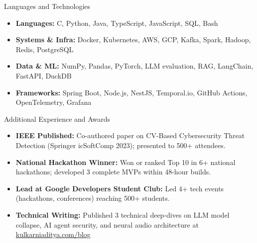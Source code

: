 \documentclass[]{mcdowellcv}
\begin{document}
\begin{cvsection}{Languages and Technologies}
  \begin{cvsubsection}{}{}{}
    \begin{itemize}
      \item \textbf{Languages:} C, Python, Java, TypeScript, JavaScript, SQL, Bash
      \item \textbf{Systems \& Infra:} Docker, Kubernetes, AWS, GCP, Kafka, Spark, Hadoop, Redis, PostgreSQL
      \item \textbf{Data \& ML:} NumPy, Pandas, PyTorch, LLM evaluation, RAG, LangChain, FastAPI, DuckDB
      \item \textbf{Frameworks:} Spring Boot, Node.js, NestJS, Temporal.io, GitHub Actions, OpenTelemetry, Grafana
    \end{itemize}
  \end{cvsubsection}
\end{cvsection}

\begin{cvsection}{Additional Experience and Awards}
  \begin{cvsubsection}{}{}{}
    \begin{itemize}
      \item \textbf{IEEE Published:} Co-authored paper on CV-Based Cybersecurity Threat Detection (Springer icSoftComp 2023); presented to 500+ attendees.
      \item \textbf{National Hackathon Winner:} Won or ranked Top 10 in 6+ national hackathons; developed 3 complete MVPs within 48-hour builds.
      \item \textbf{Lead at Google Developers Student Club:} Led 4+ tech events (hackathons, conferences) reaching 500+ students.
      \item \textbf{Technical Writing:} Published 3 technical deep-dives on LLM model collapse, AI agent security, and neural audio architecture at \href{https://www.kulkarniaditya.com/blog}{kulkarniaditya.com/blog}
    \end{itemize}
  \end{cvsubsection}
\end{cvsection}
\end{document}
